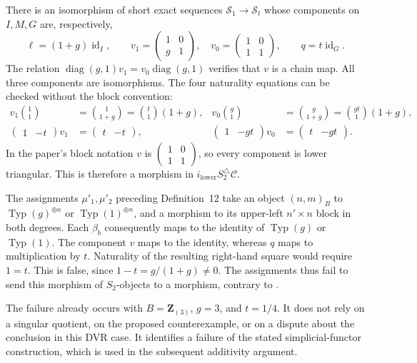 \documentclass[11pt,a4paper]{article}
\theoremstyle{remark}
\newcommand{\Z}{\mathbf Z}
\begin{document}
There is an isomorphism of short exact sequences
$\mathcal S_1\to\mathcal S_t$ whose components on $I,M,G$ are,
respectively,
\[
\ell=(1+g)\operatorname{id}_I,\qquad
v_1=\begin{pmatrix}1&0\\g&1\end{pmatrix},\quad
v_0=\begin{pmatrix}1&0\\1&1\end{pmatrix},\qquad
q=t\operatorname{id}_G.
\]
The relation $\operatorname{diag}(g,1)v_1
=v_0\operatorname{diag}(g,1)$ verifies that $v$ is a chain map.
All three components are isomorphisms. The four naturality equations
can be checked without the block convention:
\begin{align*}
v_1\binom11&=\binom{1}{1+g}
             =\binom t1(1+g),&
v_0\binom g1&=\binom{g}{1+g}
             =\binom{gt}{1}(1+g),\\
\begin{pmatrix}1&-t\end{pmatrix}v_1
 &=\begin{pmatrix}t&-t\end{pmatrix},&
\begin{pmatrix}1&-gt\end{pmatrix}v_0
 &=\begin{pmatrix}t&-gt\end{pmatrix}.
\end{align*}
In the paper's block notation $v$ is
$\begin{pmatrix}1&0\\1&1\end{pmatrix}$, so every component is
lower triangular. This is therefore a morphism in
$i_{\mathrm{lower}}S_2^{\triangle}\mathcal C$.

The assignments $\mu'_1,\mu'_2$ preceding Definition~12 take an
object $(n,m)_B$ to $\operatorname{Typ}(g)^{\oplus n}$ or
$\operatorname{Typ}(1)^{\oplus n}$, and a morphism to its upper-left
$n'\times n$ block in both degrees. Each $\beta_b$ consequently
maps to the identity of $\operatorname{Typ}(g)$ or
$\operatorname{Typ}(1)$. The component $v$ maps to the identity,
whereas $q$ maps to multiplication by $t$. Naturality of the
resulting right-hand square would require $1=t$. This is false,
since $1-t=g/(1+g)\ne0$. The assignments thus fail to send this
morphism of $S_2$-objects to a morphism, contrary to
\cite[Lemma~13(III)]{MochizukiParameters}.

The failure already occurs with $B=\Z_{(3)}$, $g=3$, and $t=1/4$.
It does not rely on a singular quotient, on the proposed
counterexample, or on a dispute about the conclusion in this DVR
case. It identifies a failure of the stated simplicial-functor
construction, which is used in the subsequent additivity argument.
\end{document}
